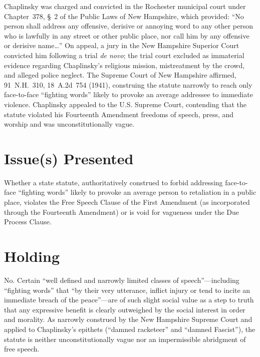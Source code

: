 \documentclass[12pt]{article}
\begin{document}
Chaplinsky was charged and convicted in the Rochester municipal court under Chapter~378, \S~2 of the Public Laws of New Hampshire, which provided: ``No person shall address any offensive, derisive or annoying word to any other person who is lawfully in any street or other public place, nor call him by any offensive or derisive name\ldots'' On appeal, a jury in the New Hampshire Superior Court convicted him following a trial \textit{de novo}; the trial court excluded as immaterial evidence regarding Chaplinsky's religious mission, mistreatment by the crowd, and alleged police neglect. The Supreme Court of New Hampshire affirmed, 91~N.H.~310, 18~A.2d~754 (1941), construing the statute narrowly to reach only face-to-face ``fighting words'' likely to provoke an average addressee to immediate violence. Chaplinsky appealed to the U.S. Supreme Court, contending that the statute violated his Fourteenth Amendment freedoms of speech, press, and worship and was unconstitutionally vague.

\section{Issue(s) Presented}
Whether a state statute, authoritatively construed to forbid addressing face-to-face ``fighting words'' likely to provoke an average person to retaliation in a public place, violates the Free Speech Clause of the First Amendment (as incorporated through the Fourteenth Amendment) or is void for vagueness under the Due Process Clause.

\section{Holding}
No. Certain ``well defined and narrowly limited classes of speech''---including ``fighting words'' that ``by their very utterance, inflict injury or tend to incite an immediate breach of the peace''---are of such slight social value as a step to truth that any expressive benefit is clearly outweighed by the social interest in order and morality. As narrowly construed by the New Hampshire Supreme Court and applied to Chaplinsky's epithets (``damned racketeer'' and ``damned Fascist''), the statute is neither unconstitutionally vague nor an impermissible abridgment of free speech.
\end{document}
